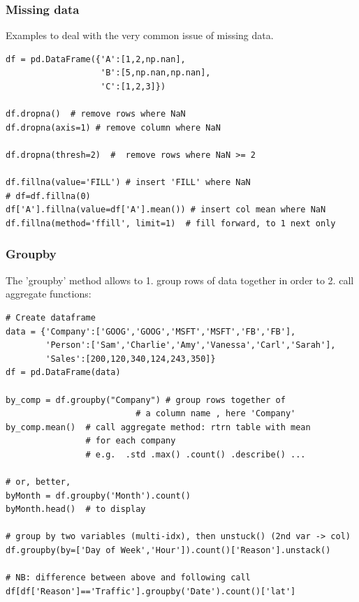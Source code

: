 \documentclass[11pt]{article}
\begin{document}
\subsubsection{Missing data} \label{missing_data_pandas}

Examples to deal with the very common issue of missing data.
\begin{lstlisting}
df = pd.DataFrame({'A':[1,2,np.nan], 
                   'B':[5,np.nan,np.nan],
                   'C':[1,2,3]})

df.dropna()  # remove rows where NaN
df.dropna(axis=1) # remove column where NaN

df.dropna(thresh=2)  #  remove rows where NaN >= 2

df.fillna(value='FILL') # insert 'FILL' where NaN
# df=df.fillna(0)
df['A'].fillna(value=df['A'].mean()) # insert col mean where NaN 
df.fillna(method='ffill', limit=1)  # fill forward, to 1 next only
\end{lstlisting}

\subsubsection{Groupby}
The 'groupby' method allows to 1. group rows of data together in order to 2. call aggregate functions:
\begin{lstlisting}
# Create dataframe
data = {'Company':['GOOG','GOOG','MSFT','MSFT','FB','FB'],
        'Person':['Sam','Charlie','Amy','Vanessa','Carl','Sarah'],
        'Sales':[200,120,340,124,243,350]}
df = pd.DataFrame(data)

by_comp = df.groupby("Company") # group rows together of 
                          # a column name , here 'Company'
by_comp.mean()  # call aggregate method: rtrn table with mean 
                # for each company
                # e.g.  .std .max() .count() .describe() ...
                
# or, better,
byMonth = df.groupby('Month').count()
byMonth.head()  # to display

# group by two variables (multi-idx), then unstuck() (2nd var -> col)
df.groupby(by=['Day of Week','Hour']).count()['Reason'].unstack()

# NB: difference between above and following call 
df[df['Reason']=='Traffic'].groupby('Date').count()['lat']
\end{lstlisting}
\end{document}
